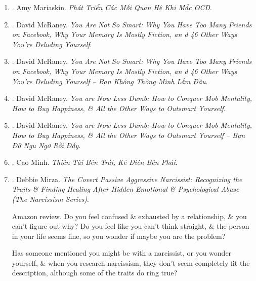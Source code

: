 \documentclass{article}
\begin{document}
\begin{enumerate}
	\item \cite{Mariaskin_OCD}. Amy Mariaskin. {\it Phát Triển Các Mối Quan Hệ Khi Mắc OCD}.\hfill{\sf[done]}
	
	\item \cite{McRaney_not_smart}. {\sc David McRaney}. {\it You Are Not So Smart: Why You Have Too Many Friends on Facebook, Why Your Memory Is Mostly Fiction, an d 46 Other Ways You're Deluding Yourself}.
	
	\item \cite{McRaney_not_smart_VN}. {\sc David McRaney}. {\it You Are Not So Smart: Why You Have Too Many Friends on Facebook, Why Your Memory Is Mostly Fiction, an d 46 Other Ways You're Deluding Yourself -- Bạn Không Thông Minh Lắm Đâu}.\hfill{\sf[done]}
	
	\item \cite{McRaney_less_stupid}. {\sc David McRaney}. {\it You are Now Less Dumb: How to Conquer Mob Mentality, How to Buy Happiness, \& All the Other Ways to Outsmart Yourself}.
	
	\item \cite{McRaney_less_stupid_VN}. {\sc David McRaney}. {\it You are Now Less Dumb: How to Conquer Mob Mentality, How to Buy Happiness, \& All the Other Ways to Outsmart Yourself -- Bạn Đỡ Ngu Ngơ Rồi Đấy}.\hfill{\sf[done]}
	
	\item \cite{Minh2022}. Cao Minh. {\it Thiên Tài Bên Trái, Kẻ Điên Bên Phải}.\hfill{\sf[done]}
	
	\item \cite{Mirza_covert_passive_aggressive_narcissist}. {\sc Debbie Mirza}. {\it The Covert Passive Aggressive Narcissist: Recognizing the Traits \& Finding Healing After Hidden Emotional \& Psychological Abuse (The Narcissism Series)}. {}\hfill{\sf[done]}
	
	{\sf Amazon review.} Do you feel confused \& exhausted by a relationship, \& you can't figure out why? Do you feel like you can't think straight, \& the person in your life seems fine, so you wonder if maybe you are the problem?
	
	Has someone mentioned you might be with a narcissist, or you wonder yourself, \& when you research narcissism, they don't seem completely fit the description, although some of the traits do ring true?
	

\end{enumerate}
\end{document}
